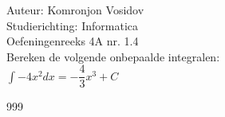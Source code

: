 \documentclass[a4paper]{article}
\newcommand{\dint}{\displaystyle\int}
\begin{document}
	
	\noindent \large Auteur: Komronjon Vosidov \\
	\noindent \large Studierichting: Informatica\\
	\noindent \large Oefeningenreeks 4A nr. 1.4\\
	
	
	\medskip
	\normalsize
	Bereken de volgende onbepaalde integralen:\\
	
	$\dint -4x^2 dx = -\dfrac{4}{3}x^3 + C  $ \\
	
	
	
	
	
	
	\begin{thebibliography}{999}
	\end{thebibliography}		
\end{document}
